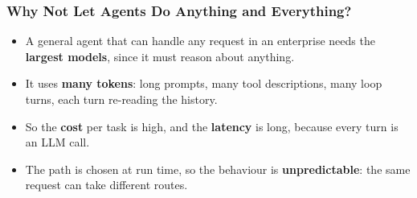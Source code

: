\begin{frame}[fragile]\frametitle{Why Not Let Agents Do Anything and Everything?}
\begin{itemize}
\item A general agent that can handle any request in an enterprise needs the \textbf{largest models}, since it must reason about anything.
\item It uses \textbf{many tokens}: long prompts, many tool descriptions, many loop turns, each turn re-reading the history.
\item So the \textbf{cost} per task is high, and the \textbf{latency} is long, because every turn is an LLM call.
\item The path is chosen at run time, so the behaviour is \textbf{unpredictable}: the same request can take different routes.
\end{itemize}
\end{frame}


